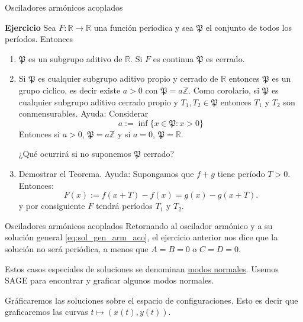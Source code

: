 \documentclass[hyperref={colorlinks=true}]{beamer}
\newcommand{\rr}{\mathbb{R}}
\renewcommand{\emph}[1]{\textcolor[rgb]{1,0,0}{#1}}
\begin{document}
\begin{frame}{Osciladores armónicos acoplados}

\textbf{Ejercicio} Sea $F:\rr\to\rr$ una función períodica y sea $\mathfrak{P}$ el conjunto de todos los períodos. Entonces
\begin{enumerate}
 \item $\mathfrak{P}$ es un subgrupo aditivo  de $\rr$. Si $F$ es continua $\mathfrak{P}$ es cerrado. 
 \item Si $\mathfrak{P}$ es cualquier subgrupo aditivo propio y cerrado de $\rr$  entonces  $\mathfrak{P}$ es un grupo ciclico, es decir existe $a>0$ con $\mathfrak{P}=a\mathbb{Z}$.  Como corolario, si $\mathfrak{P}$ es cualquier subgrupo  aditivo cerrado propio  y $T_1,T_2\in \mathfrak{P}$ entonces $T_1$ y $T_2$ son conmensurables. \emph{Ayuda:} Considerar
\[a:=\inf\{x\in \mathfrak{P}:x>0\}\]
Entonces si $a>0$,  $\mathfrak{P}=a\mathbb{Z}$ y si $a=0$,  $\mathfrak{P}=\rr$. 

¿Qué ocurrirá si no suponemos $\mathfrak{P}$ cerrado? 

 \item Demostrar el Teorema. \emph{Ayuda:} Supongamos  que $f+g$ tiene período $T>0$. Entonces:
\[F(x):=f(x+T)-f(x)=g(x)-g(x+T).\]
y por consiguiente $F$ tendrá períodos $T_1$ y $T_2$. 
 \end{enumerate} 
 

\end{frame}


\begin{frame}{Osciladores armónicos acoplados}
Retornando al oscilador armónico y a su solución general \eqref{eq:sol_gen_arm_aco}, el ejercicio anterior nos dice  que la solución no será periódica, a menos que $A=B=0$ o $C=D=0$. 

Estos casos especiales de soluciones se denominan \href{http://es.wikipedia.org/wiki/Modo_normal}{modos normales}.  Usemos SAGE para encontrar y graficar algunos modos normales. 

Gráficaremos las soluciones sobre el espacio de configuraciones. Esto es decir que graficaremos las curvas $t\mapsto (x(t),y(t))$. 



 

\end{frame}
\end{document}
